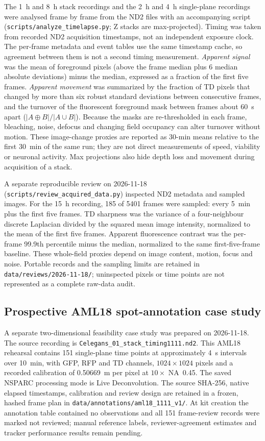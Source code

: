 \documentclass[11pt]{article}
\begin{document}
The 1~h and 8~h stack recordings and the 2~h and 4~h single-plane recordings were
analysed frame by frame from the ND2 files with an accompanying script
(\texttt{scripts/analyze\_timelapse.py}; Z stacks are max-projected). Timing was
taken from recorded ND2 acquisition timestamps, not an independent exposure clock.
The per-frame metadata and event tables use the same timestamp cache, so agreement
between them is not a second timing measurement. \emph{Apparent signal} was
the mean of foreground pixels (above the frame median plus 6 median absolute
deviations) minus the median, expressed as a fraction of the first five frames.
\emph{Apparent movement} was summarized by the fraction of TD pixels that changed
by more than six robust standard deviations between consecutive frames, and the
turnover of the fluorescent foreground mask between frames about 60~s apart
($|A \oplus B|/|A \cup B|$). Because the masks are re-thresholded in each frame,
bleaching, noise, defocus and changing field occupancy can alter turnover without
motion. These image-change proxies are reported as 30-min means relative to the
first 30~min of the same run; they are not direct measurements of speed, viability
or neuronal activity. Max projections also hide depth loss and movement during
acquisition of a stack.

A separate reproducible review on 2026-11-18
(\texttt{scripts/review\_acquired\_data.py}) inspected ND2 metadata and sampled
images. For the 15~h recording, 185 of 5401 frames were sampled: every 5~min plus
the first five frames. TD sharpness was the variance of a four-neighbour discrete
Laplacian divided by the squared mean image intensity, normalized to the mean of
the first five frames. Apparent fluorescence contrast was the per-frame 99.9th
percentile minus the median, normalized to the same first-five-frame baseline.
These whole-field proxies depend on image content, motion, focus and noise.
Portable records and the sampling limits are retained in
\texttt{data/reviews/2026-11-18/}; uninspected pixels or time points are not
represented as a complete raw-data audit.

\subsection{Prospective AML18 spot-annotation case study}\label{sec:aml18-annotation}
A separate two-dimensional feasibility case study was prepared on 2026-11-18.
The source recording is \nolinkurl{Celegans_01_stack_timing1111.nd2}.
This AML18 rehearsal contains
151 single-plane time points at approximately 4~s intervals over 10~min, with
GFP, RFP and TD channels, $1024\times1024$ pixels and a recorded calibration of
0.50669~\textmu m per pixel at $10\times$ NA~0.45. The saved NSPARC processing
mode is Live Deconvolution. The source SHA-256, native elapsed timestamps,
calibration and review design are retained in a frozen, hashed frame plan in
\nolinkurl{data/annotations/aml18_1111_v1/}.
At kit creation the annotation table contained no observations and all 151
frame-review records were marked not reviewed; manual reference labels,
reviewer-agreement estimates and tracker performance results remain pending.
\end{document}
